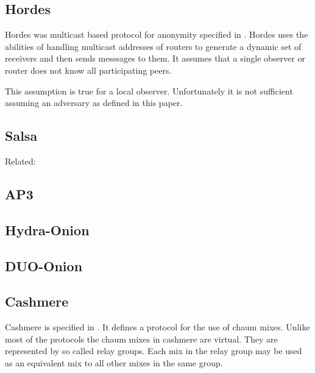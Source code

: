 \subsection{Hordes}
Hordes was multicast based protocol for anonymity specified in \cite{Levine:2002}. Hordes uses the abilities of handling multicast addresses of routers to generate a dynamic set of receivers and then sends messsages to them. It assumes that a single observer or router does not know all participating peers. 

This assumption is true for a local observer. Unfortunately it is not sufficient assuming an adversary as defined in this paper.

\subsection{Salsa}
\cite{Salsa}

Related: \cite{ccs2008:mittal}


\subsection{AP3}

\cite{mislove2004ap3}


\subsection{Hydra-Onion}
\cite{iwanik2005duo}


\subsection{DUO-Onion}
\cite{iwanik2005duo}


\subsection{Cashmere}
Cashmere is specified in \cite{zhuang2005cashmere}. It defines a protocol for the use of chaum mixes. Unlike most of the protocols the chaum mixes in cashmere are virtual. They are represented by so called relay groups. Each mix in the relay group may be used as an equivalent mix to all other mixes in the same group. 

